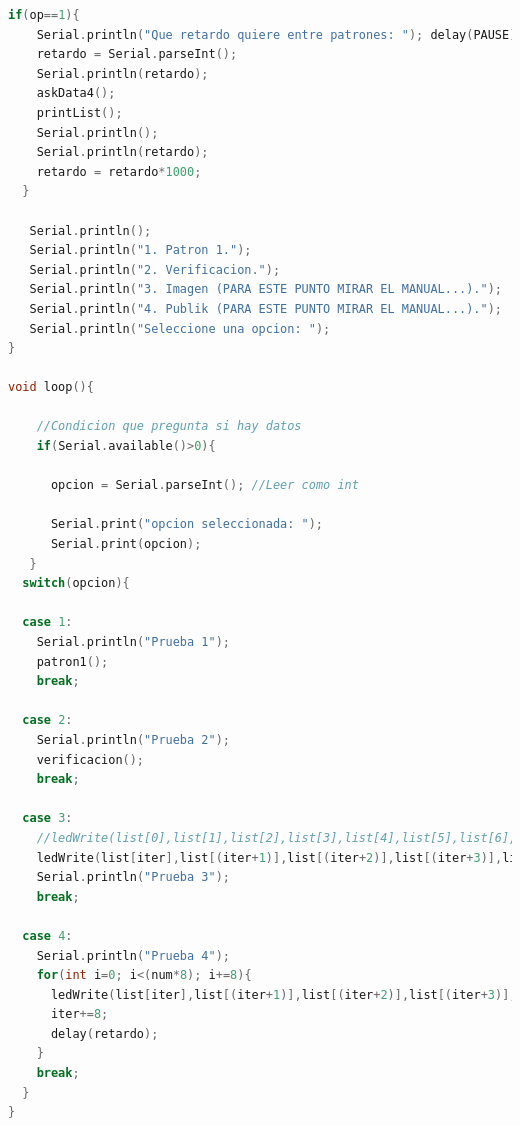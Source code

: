 \documentclass{article}
\begin{document}
\begin{lstlisting}[language=C++, label=codigo_ejemplo]
  if(op==1){
    Serial.println("Que retardo quiere entre patrones: "); delay(PAUSE);
    retardo = Serial.parseInt();
    Serial.println(retardo);
	askData4();
    printList();
    Serial.println();
    Serial.println(retardo);
    retardo = retardo*1000;
  }
  
   Serial.println();
   Serial.println("1. Patron 1.");
   Serial.println("2. Verificacion.");
   Serial.println("3. Imagen (PARA ESTE PUNTO MIRAR EL MANUAL...).");
   Serial.println("4. Publik (PARA ESTE PUNTO MIRAR EL MANUAL...).");
   Serial.println("Seleccione una opcion: ");
}

void loop(){
  
    //Condicion que pregunta si hay datos
    if(Serial.available()>0){
   
      opcion = Serial.parseInt(); //Leer como int
      
      Serial.print("opcion seleccionada: ");
      Serial.print(opcion);
   }
  switch(opcion){
    
  case 1:
    Serial.println("Prueba 1");
    patron1();
    break;
    
  case 2:
    Serial.println("Prueba 2");
    verificacion();
    break;
    
  case 3:
    //ledWrite(list[0],list[1],list[2],list[3],list[4],list[5],list[6],list[7]); delay(TEMPO);
    ledWrite(list[iter],list[(iter+1)],list[(iter+2)],list[(iter+3)],list[(iter+4)],list[(iter+5)],list[(iter+6)],list[(iter+7)]); delay(TEMPO);
  	Serial.println("Prueba 3");
 	break;
    
  case 4:
  	Serial.println("Prueba 4");
    for(int i=0; i<(num*8); i+=8){
      ledWrite(list[iter],list[(iter+1)],list[(iter+2)],list[(iter+3)],list[(iter+4)],list[(iter+5)],list[(iter+6)],list[(iter+7)]); delay(TEMPO);
      iter+=8;
      delay(retardo);    
    }
  	break;
  }
}
\end{lstlisting}
\end{document}
